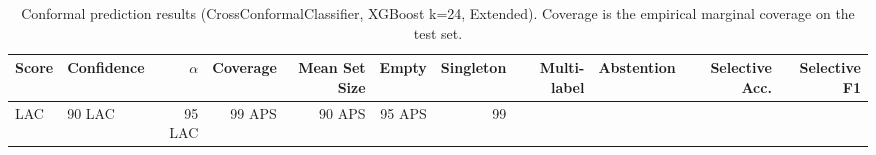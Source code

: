 \begin{table}
\caption{Conformal prediction results (CrossConformalClassifier, XGBoost k=24, Extended). Coverage is the empirical marginal coverage on the test set.}
\label{tab:conformal_ext_results}
\begin{tabular}{llrrrrrrrrr}
\toprule
Score & Confidence & $\alpha$ & Coverage & Mean Set Size & Empty & Singleton & Multi-label & Abstention & Selective Acc. & Selective F1 \\
\midrule
LAC & 90%
LAC & 95%
LAC & 99%
APS & 90%
APS & 95%
APS & 99%
\bottomrule
\end{tabular}
\end{table}
